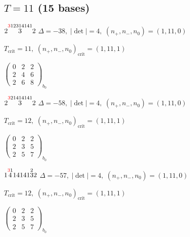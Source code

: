 \documentclass[10pt]{article}
\begin{document}
\subsection*{$T = 11$ \quad (15 bases)}
\smallskip

$2\overset{\textcolor{red}{3}12314141}{3}2$ \quad $\Delta=-38,\; |\det|=4,\; (n_+,n_-,n_0)=(1,11,0)$

\hspace{1em}$T_{\text{crit}}=11,\; (n_+,n_-,n_0)_{\text{crit}}=(1,11,1)$

\hspace{2em}$\left(\begin{smallmatrix}0 & 2 & 2 \\ 2 & 4 & 6 \\ 2 & 6 & 8\end{smallmatrix}\right)_{\!b_0}$

\smallskip

$2\overset{\textcolor{red}{3}21414141}{3}2$ \quad $\Delta=-58,\; |\det|=4,\; (n_+,n_-,n_0)=(1,11,0)$

\hspace{1em}$T_{\text{crit}}=12,\; (n_+,n_-,n_0)_{\text{crit}}=(1,11,1)$

\hspace{2em}$\left(\begin{smallmatrix}0 & 2 & 2 \\ 2 & 3 & 5 \\ 2 & 5 & 7\end{smallmatrix}\right)_{\!b_0}$

\smallskip

$1\overset{\textcolor{red}{3}1}{4}14141\overset{2}{3}2$ \quad $\Delta=-57,\; |\det|=4,\; (n_+,n_-,n_0)=(1,11,0)$

\hspace{1em}$T_{\text{crit}}=12,\; (n_+,n_-,n_0)_{\text{crit}}=(1,11,1)$

\hspace{2em}$\left(\begin{smallmatrix}0 & 2 & 2 \\ 2 & 3 & 5 \\ 2 & 5 & 7\end{smallmatrix}\right)_{\!b_0}$

\smallskip
\end{document}
